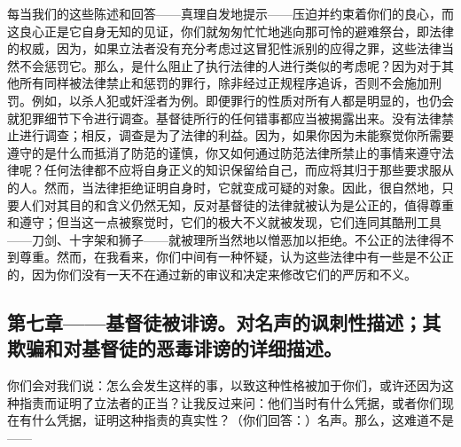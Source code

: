 每当我们的这些陈述和回答——真理自发地提示——压迫并约束着你们的良心，而这良心正是它自身无知的见证，你们就匆匆忙忙地逃向那可怜的避难祭台，即法律的权威，因为，如果立法者没有充分考虑过这冒犯性派别的应得之罪，这些法律当然不会惩罚它。那么，是什么阻止了执行法律的人进行类似的考虑呢？因为对于其他所有同样被法律禁止和惩罚的罪行，除非经过正规程序追诉，否则不会施加刑罚。例如，以杀人犯或奸淫者为例。即便罪行的性质对所有人都是明显的，也仍会就犯罪细节下令进行调查。基督徒所行的任何错事都应当被揭露出来。没有法律禁止进行调查；相反，调查是为了法律的利益。因为，如果你因为未能察觉你所需要遵守的是什么而抵消了防范的谨慎，你又如何通过防范法律所禁止的事情来遵守法律呢？任何法律都不应将自身正义的知识保留给自己，而应将其归于那些要求服从的人。然而，当法律拒绝证明自身时，它就变成可疑的对象。因此，很自然地，只要人们对其目的和含义仍然无知，反对基督徒的法律就被认为是公正的，值得尊重和遵守；但当这一点被察觉时，它们的极大不义就被发现，它们连同其酷刑工具——刀剑、十字架和狮子——就被理所当然地以憎恶加以拒绝。不公正的法律得不到尊重。然而，在我看来，你们中间有一种怀疑，认为这些法律中有一些是不公正的，因为你们没有一天不在通过新的审议和决定来修改它们的严厉和不义。\par


\subsection{第七章——基督徒被诽谤。对名声的讽刺性描述；其欺骗和对基督徒的恶毒诽谤的详细描述。}

你们会对我们说：怎么会发生这样的事，以致这种性格被加于你们，或许还因为这种指责而证明了立法者的正当？让我反过来问：他们当时有什么凭据，或者你们现在有什么凭据，证明这种指责的真实性？（你们回答：）名声。那么，这难道不是——\par

\par

